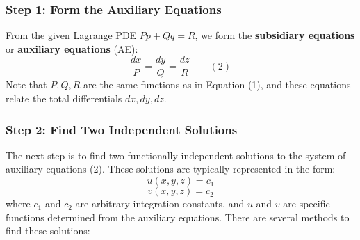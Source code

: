 \documentclass{article}
\theoremstyle{remark}
\begin{document}
	\subsubsection{Step 1: Form the Auxiliary Equations}
	From the given Lagrange PDE $Pp + Qq = R$, we form the \textbf{subsidiary equations} or \textbf{auxiliary equations} (AE):
	\[
	\frac{dx}{P} = \frac{dy}{Q} = \frac{dz}{R} \quad \quad (2)
	\]
	Note that $P, Q, R$ are the same functions as in Equation (1), and these equations relate the total differentials $dx, dy, dz$.
	
	\subsubsection{Step 2: Find Two Independent Solutions}
	The next step is to find two functionally independent solutions to the system of auxiliary equations (2). These solutions are typically represented in the form:
	\[ u(x, y, z) = c_1 \]
	\[ v(x, y, z) = c_2 \]
	where $c_1$ and $c_2$ are arbitrary integration constants, and $u$ and $v$ are specific functions determined from the auxiliary equations. There are several methods to find these solutions:
	
\end{document}
